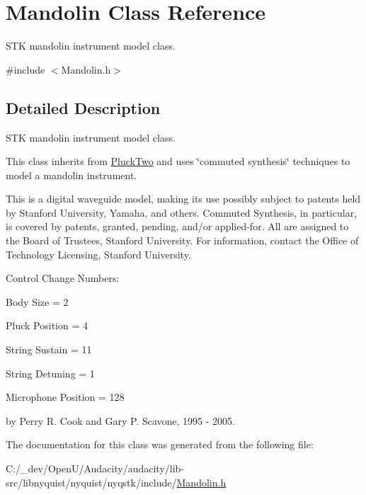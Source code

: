 \hypertarget{class_mandolin}{}\section{Mandolin Class Reference}
\label{class_mandolin}


S\+TK mandolin instrument model class.  




{\ttfamily \#include $<$Mandolin.\+h$>$}



\subsection{Detailed Description}
S\+TK mandolin instrument model class. 

This class inherits from \hyperlink{class_pluck_two}{Pluck\+Two} and uses \char`\"{}commuted synthesis\char`\"{} techniques to model a mandolin instrument.

This is a digital waveguide model, making its use possibly subject to patents held by Stanford University, Yamaha, and others. Commuted Synthesis, in particular, is covered by patents, granted, pending, and/or applied-\/for. All are assigned to the Board of Trustees, Stanford University. For information, contact the Office of Technology Licensing, Stanford University.

Control Change Numbers\+:
\begin{DoxyItemize}
\item Body Size = 2
\item Pluck Position = 4
\item String Sustain = 11
\item String Detuning = 1
\item Microphone Position = 128
\end{DoxyItemize}

by Perry R. Cook and Gary P. Scavone, 1995 -\/ 2005. 

The documentation for this class was generated from the following file\+:\begin{DoxyCompactItemize}
\item 
C\+:/\+\_\+dev/\+Open\+U/\+Audacity/audacity/lib-\/src/libnyquist/nyquist/nyqstk/include/\hyperlink{_mandolin_8h}{Mandolin.\+h}\end{DoxyCompactItemize}
